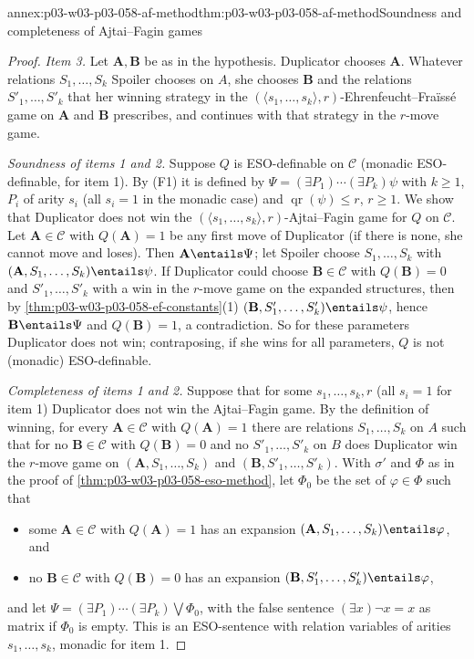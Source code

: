 \begin{annexitem}{annex:p03-w03-p03-058-af-method}{thm:p03-w03-p03-058-af-method}{Soundness and completeness of Ajtai--Fagin games}
\begin{proof}
\emph{Item 3.} Let \(\mathbf A,\mathbf B\) be as in the hypothesis.
Duplicator chooses \(\mathbf A\). Whatever relations \(S_1,\ldots,S_k\)
Spoiler chooses on \(A\), she chooses \(\mathbf B\) and the relations
\(S'_1,\ldots,S'_k\) that her winning strategy in the
\((\langle s_1,\ldots,s_k\rangle,r)\)-Ehrenfeucht--Fra\"iss\'e game on
\(\mathbf A\) and \(\mathbf B\) prescribes, and continues with that
strategy in the \(r\)-move game.

\emph{Soundness of items 1 and 2.} Suppose \(Q\) is ESO-definable on
\(\mathcal C\) (monadic ESO-definable, for item 1). By (F1) it is defined by
\(\Psi=(\exists P_1)\cdots(\exists P_k)\psi\) with \(k\ge1\), \(P_i\) of
arity \(s_i\) (all \(s_i=1\) in the monadic case) and
\(\operatorname{qr}(\psi)\le r\), \(r\ge1\). We show that Duplicator does
not win the \((\langle s_1,\ldots,s_k\rangle,r)\)-Ajtai--Fagin game for
\(Q\) on \(\mathcal C\). Let \(\mathbf A\in\mathcal C\) with
\(Q(\mathbf A)=1\) be any first move of Duplicator (if there is none, she
cannot move and loses). Then \(\mathbf A\entails\Psi\); let Spoiler choose
\(S_1,\ldots,S_k\) with \((\mathbf A,S_1,\ldots,S_k)\entails\psi\). If
Duplicator could choose \(\mathbf B\in\mathcal C\) with \(Q(\mathbf B)=0\)
and \(S'_1,\ldots,S'_k\) with a win in the \(r\)-move game on the expanded
structures, then by \cref{thm:p03-w03-p03-058-ef-constants}(1)
\((\mathbf B,S'_1,\ldots,S'_k)\entails\psi\), hence
\(\mathbf B\entails\Psi\) and \(Q(\mathbf B)=1\), a contradiction. So for
these parameters Duplicator does not win; contraposing, if she wins for all
parameters, \(Q\) is not (monadic) ESO-definable.

\emph{Completeness of items 1 and 2.} Suppose that for some
\(s_1,\ldots,s_k,r\) (all \(s_i=1\) for item 1) Duplicator does not win the
Ajtai--Fagin game. By the definition of winning, for every
\(\mathbf A\in\mathcal C\) with \(Q(\mathbf A)=1\) there are relations
\(S_1,\ldots,S_k\) on \(A\) such that for no \(\mathbf B\in\mathcal C\) with
\(Q(\mathbf B)=0\) and no \(S'_1,\ldots,S'_k\) on \(B\) does Duplicator win
the \(r\)-move game on \((\mathbf A,S_1,\ldots,S_k)\) and
\((\mathbf B,S'_1,\ldots,S'_k)\). With \(\sigma'\) and \(\Phi\) as in the
proof of \cref{thm:p03-w03-p03-058-eso-method}, let \(\Phi_0\) be the set of
\(\varphi\in\Phi\) such that
\begin{itemize}
\item some \(\mathbf A\in\mathcal C\) with \(Q(\mathbf A)=1\) has an
      expansion \((\mathbf A,S_1,\ldots,S_k)\entails\varphi\), and
\item no \(\mathbf B\in\mathcal C\) with \(Q(\mathbf B)=0\) has an expansion
      \((\mathbf B,S'_1,\ldots,S'_k)\entails\varphi\),
\end{itemize}
and let \(\Psi=(\exists P_1)\cdots(\exists P_k)\bigvee\Phi_0\), with the
false sentence \((\exists x)\neg x=x\) as matrix if \(\Phi_0\) is empty.
This is an ESO-sentence with relation variables of arities
\(s_1,\ldots,s_k\), monadic for item 1.


\end{proof}
\end{annexitem}
